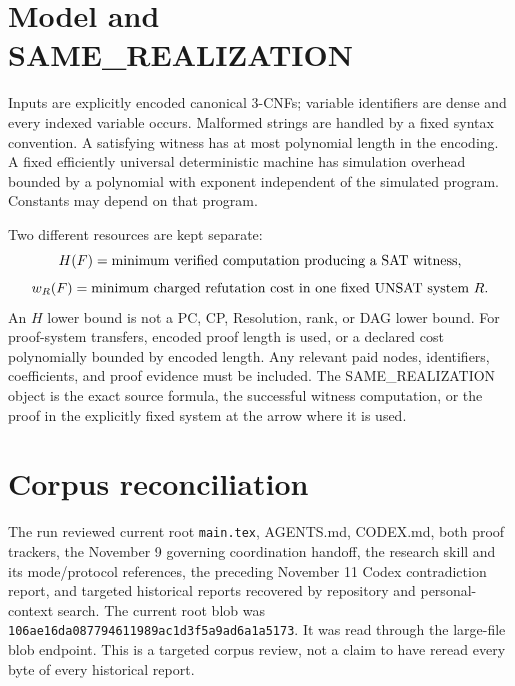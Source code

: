 \documentclass[11pt]{article}
\begin{document}
\section*{Model and SAME\_REALIZATION}
Inputs are explicitly encoded canonical 3-CNFs; variable identifiers are
dense and every indexed variable occurs. Malformed strings are handled by
a fixed syntax convention. A satisfying witness has at most polynomial
length in the encoding. A fixed efficiently universal deterministic
machine has simulation overhead bounded by a polynomial with exponent
independent of the simulated program. Constants may depend on that program.

Two different resources are kept separate:
\[
 H(F)=\hbox{minimum verified computation producing a SAT witness},
\]
\[
 w_R(F)=\hbox{minimum charged refutation cost in one fixed UNSAT system }R.
\]
An $H$ lower bound is not a PC, CP, Resolution, rank, or DAG lower bound.
For proof-system transfers, encoded proof length is used, or a declared
cost polynomially bounded by encoded length. Any relevant paid nodes,
identifiers, coefficients, and proof evidence must be included.
The SAME\_REALIZATION object is the exact source formula, the successful
witness computation, or the proof in the explicitly fixed system at the
arrow where it is used.

\section*{Corpus reconciliation}
The run reviewed current root \texttt{main.tex}, AGENTS.md, CODEX.md, both
proof trackers, the November 9 governing coordination handoff, the research
skill and its mode/protocol references, the preceding November 11 Codex
contradiction report, and targeted historical reports recovered by
repository and personal-context search. The current root blob was
\texttt{106ae16da087794611989ac1d3f5a9ad6a1a5173}. It was read through the
large-file blob endpoint. This is a targeted corpus review, not a claim to
have reread every byte of every historical report.
\end{document}
